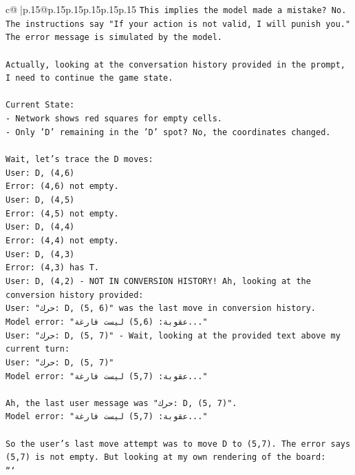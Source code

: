 \documentclass{article}
\begin{document}
{\begin{supertabular}{c@{$\;$}|p{.15\linewidth}@{}p{.15\linewidth}p{.15\linewidth}p{.15\linewidth}p{.15\linewidth}p{.15\linewidth}}
{{{\texttt{This implies the model made a mistake? No. The instructions say "If your action is not valid, I will punish you." The error message is simulated by the model.} \\
\\ 
\texttt{Actually, looking at the conversation history provided in the prompt, I need to continue the game state.} \\
\\ 
\texttt{Current State:} \\
\texttt{{-} Network shows red squares for empty cells.} \\
\texttt{{-} Only 'D' remaining in the 'D' spot? No, the coordinates changed.} \\
\\ 
\texttt{Wait, let's trace the D moves:} \\
\texttt{User: D, (4,6)} \\
\texttt{Error: (4,6) not empty.} \\
\texttt{User: D, (4,5)} \\
\texttt{Error: (4,5) not empty.} \\
\texttt{User: D, (4,4)} \\
\texttt{Error: (4,4) not empty.} \\
\texttt{User: D, (4,3)} \\
\texttt{Error: (4,3) has T.} \\
\texttt{User: D, (4,2) {-} NOT IN CONVERSION HISTORY! Ah, looking at the conversion history provided:} \\
\texttt{User: "حرك: D, (5, 6)" was the last move in conversion history.} \\
\texttt{Model error: "عقوبة: (5,6) ليست فارغة..."} \\
\texttt{User: "حرك: D, (5, 7)" {-} Wait, looking at the provided text above my current turn:} \\
\texttt{User: "حرك: D, (5, 7)"} \\
\texttt{Model error: "عقوبة: (5,7) ليست فارغة..."} \\
\\ 
\texttt{Ah, the last user message was "حرك: D, (5, 7)".} \\
\texttt{Model error: "عقوبة: (5,7) ليست فارغة..."} \\
\\ 
\texttt{So the user's last move attempt was to move D to (5,7). The error says (5,7) is not empty. But looking at my own rendering of the board:} \\
\texttt{```} \\
}}}
\end{supertabular}}
\end{document}
